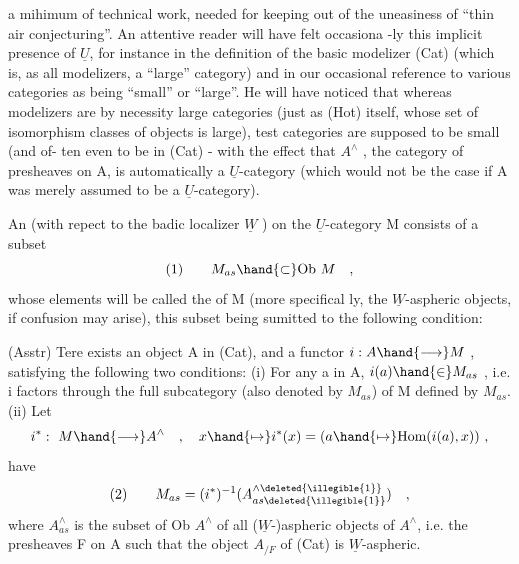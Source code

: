 a mihimum of technical work,  needed for keeping out of the uneasiness
of ``thin air conjecturing''\hand{)}. An attentive reader will have felt occasiona%
-ly this implicit presence of $\underline{U}$,  for instance in the definition of the
basic modelizer (Cat) (which is,  as all modelizers,  a ``large'' category)\hand{,}
and in our occasional reference to various categories as being ``small'' or
``large''.  He will have noticed that whereas modelizers are by necessity
large categories (just as (Hot) itself,  whose set of isomorphism classes
of objects is large),  test categories are supposed to be small (and of-%
ten even to be in (Cat)\hand{)} -  with the effect that $A^{\wedge}$ ,  the category of
presheaves on A, is automatically a $\underline{U}$-category  (which would not be the
case if A was merely assumed to be a $\underline{U}$-category).

An \hand{\uline{\textcolor{black}{asphericity}}} \hand{\uline{\textcolor{black}{structure}}} (with repect to the badic localizer $\underline{W}$ )
on the $\underline{U}$-category M consists of a subset
\[ \text{(1)} \qquad M_{as} \hand{\subset} \text{Ob } M \quad , \]
whose elements will be called the \hand{\uline{\textcolor{black}{aspheric objects}}} of M  (more specifical%
ly,  the $\underline{W}$-aspheric objects,  if confusion may arise),  this subset being
sumitted to the following condition:

(Asstr)  Tere exists an object A in (Cat),  and a functor $i: A \hand{\longrightarrow} M$ ,
satisfying the following two conditions:
(i)  For any a in A,  $i(a) \hand{\in} M_{as}$ ,  i.e.  i factors through the
full subcategory (also denoted by $M_{as}$) of M defined by $M_{as}$.
(ii)  Let
\[ i^{*}:\ M \hand{\longrightarrow} A^{\wedge} \quad , \quad x \hand{\mapsto} i^{*}(x) = (a \hand{\mapsto} \text{Hom}(i(a),x)) \ , \]
   have
\[ \text{(2)} \qquad M_{as} = (i^{*})^{-1}(A^{\wedge\deleted{\illegible{1}}}_{as\deleted{\illegible{1}}}) \quad , \]
where $A^{\wedge}_{as}$ is the subset of Ob $A^{\wedge}$ of all ($\underline{W}$-)aspheric objects
of $A^{\wedge}$,  i.e. the  presheaves F on A such that the
object $A_{/F}$  of (Cat) is $\underline{W}$-aspheric.

